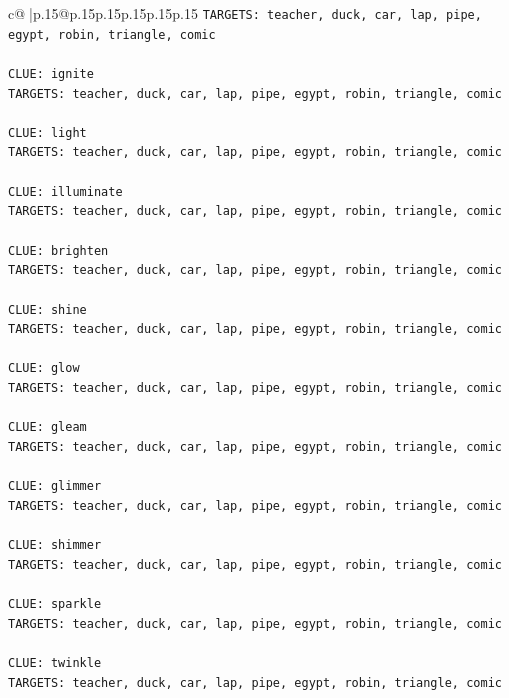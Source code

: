 \documentclass{article}
\begin{document}
{\begin{supertabular}{c@{$\;$}|p{.15\linewidth}@{}p{.15\linewidth}p{.15\linewidth}p{.15\linewidth}p{.15\linewidth}p{.15\linewidth}}
{{{\texttt{TARGETS: teacher, duck, car, lap, pipe, egypt, robin, triangle, comic} \\
\\ 
\texttt{CLUE: ignite} \\
\texttt{TARGETS: teacher, duck, car, lap, pipe, egypt, robin, triangle, comic} \\
\\ 
\texttt{CLUE: light} \\
\texttt{TARGETS: teacher, duck, car, lap, pipe, egypt, robin, triangle, comic} \\
\\ 
\texttt{CLUE: illuminate} \\
\texttt{TARGETS: teacher, duck, car, lap, pipe, egypt, robin, triangle, comic} \\
\\ 
\texttt{CLUE: brighten} \\
\texttt{TARGETS: teacher, duck, car, lap, pipe, egypt, robin, triangle, comic} \\
\\ 
\texttt{CLUE: shine} \\
\texttt{TARGETS: teacher, duck, car, lap, pipe, egypt, robin, triangle, comic} \\
\\ 
\texttt{CLUE: glow} \\
\texttt{TARGETS: teacher, duck, car, lap, pipe, egypt, robin, triangle, comic} \\
\\ 
\texttt{CLUE: gleam} \\
\texttt{TARGETS: teacher, duck, car, lap, pipe, egypt, robin, triangle, comic} \\
\\ 
\texttt{CLUE: glimmer} \\
\texttt{TARGETS: teacher, duck, car, lap, pipe, egypt, robin, triangle, comic} \\
\\ 
\texttt{CLUE: shimmer} \\
\texttt{TARGETS: teacher, duck, car, lap, pipe, egypt, robin, triangle, comic} \\
\\ 
\texttt{CLUE: sparkle} \\
\texttt{TARGETS: teacher, duck, car, lap, pipe, egypt, robin, triangle, comic} \\
\\ 
\texttt{CLUE: twinkle} \\
\texttt{TARGETS: teacher, duck, car, lap, pipe, egypt, robin, triangle, comic} \\
}}}
\end{supertabular}}
\end{document}
